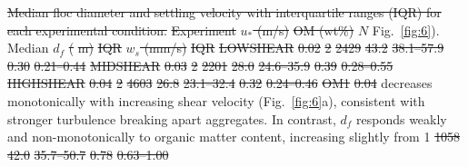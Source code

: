 \documentclass{agujournal2019}
\providecommand{\DIFadd}[1]{{\protect\color{blue} #1}} %
\providecommand{\DIFdel}[1]{{\protect\color{red}\sout{#1}}} %
\providecommand{\DIFaddFL}[1]{\DIFadd{#1}} %
\providecommand{\DIFdelFL}[1]{\DIFdel{#1}} %
\providecommand{\DIFaddbeginFL}{} %
\providecommand{\DIFaddendFL}{} %
\providecommand{\DIFdelbeginFL}{} %
\providecommand{\DIFdelendFL}{} %
\newcommand{\DIFscaledelfig}{0.5}
\newlength{\DIFdelgraphicswidth} %
\newlength{\DIFdelgraphicsheight} %
\newcommand{\DIFaddincludegraphics}[2][]{{\color{blue}\fbox{\DIFOincludegraphics[#1]{#2}}}} %
\newcommand{\DIFdelincludegraphics}[2][]{%
\sbox{\DIFdelgraphicsbox}{\DIFOincludegraphics[#1]{#2}}%
\settoboxwidth{\DIFdelgraphicswidth}{\DIFdelgraphicsbox} %
\settoboxtotalheight{\DIFdelgraphicsheight}{\DIFdelgraphicsbox} %
\scalebox{\DIFscaledelfig}{%
\parbox[b]{\DIFdelgraphicswidth}{\usebox{\DIFdelgraphicsbox}\\[-\baselineskip] \rule{\DIFdelgraphicswidth}{0em}}\llap{\resizebox{\DIFdelgraphicswidth}{\DIFdelgraphicsheight}{%
\setlength{\unitlength}{\DIFdelgraphicswidth}%
\begin{picture}(1,1)%
\thicklines\linethickness{2pt} %
{\color[rgb]{1,0,0}\put(0,0){\framebox(1,1){}}}%
{\color[rgb]{1,0,0}\put(0,0){\line( 1,1){1}}}%
{\color[rgb]{1,0,0}\put(0,1){\line(1,-1){1}}}%
\end{picture}%
}\hspace*{3pt}}} %
} %
\DeclareRobustCommand{\DIFaddbeginFL}{\DIFOaddbeginFL \let\includegraphics\DIFaddincludegraphics} %
\DeclareRobustCommand{\DIFaddendFL}{\DIFOaddendFL \let\includegraphics\DIFOincludegraphics} %
\DeclareRobustCommand{\DIFdelbeginFL}{\DIFOdelbeginFL \let\includegraphics\DIFdelincludegraphics} %
\DeclareRobustCommand{\DIFdelendFL}{\DIFOaddendFL \let\includegraphics\DIFOincludegraphics} %
\begin{document}
{%
\DIFdelFL{Median floc diameter and settling velocity with interquartile ranges (IQR) for each experimental condition.}%
}
\DIFdelFL{Experiment }%
\DIFdelFL{$u_*$ (m/s) }%
\DIFdelFL{OM (wt\%)}%
\DIFdelFL{$N$ }%
\DIFdelendFL \DIFaddbeginFL \DIFaddFL{Fig.~\ref{fig:6}). Median }\DIFaddendFL $d_f$ \DIFdelbeginFL \DIFdelFL{(}%
\DIFdelFL{m) }%
\DIFdelFL{IQR}%
\DIFdelFL{$w_s$ (mm/s)}%
\DIFdelFL{IQR}%
\DIFdelFL{LOWSHEAR  }%
\DIFdelFL{0.02 }%
\DIFdelFL{2 }%
\DIFdelFL{2429 }%
\DIFdelFL{43.2 }%
\DIFdelFL{38.1--57.9}%
\DIFdelFL{0.30 }%
\DIFdelFL{0.21--0.44}%
\DIFdelFL{MIDSHEAR  }%
\DIFdelFL{0.03 }%
\DIFdelFL{2 }%
\DIFdelFL{2201 }%
\DIFdelFL{28.0 }%
\DIFdelFL{24.6--35.9}%
\DIFdelFL{0.39 }%
\DIFdelFL{0.28--0.55}%
\DIFdelFL{HIGHSHEAR }%
\DIFdelFL{0.04 }%
\DIFdelFL{2 }%
\DIFdelFL{4603 }%
\DIFdelFL{26.8 }%
\DIFdelFL{23.1--32.4}%
\DIFdelFL{0.32 }%
\DIFdelFL{0.24--0.46}%
\DIFdelFL{OM1       }%
\DIFdelFL{0.04 }%
\DIFdelendFL \DIFaddbeginFL \DIFaddFL{decreases monotonically with increasing shear velocity (Fig.~\ref{fig:6}a), consistent with stronger turbulence breaking apart aggregates. In contrast, $d_f$ responds weakly and non-monotonically to organic matter content, increasing slightly from }\DIFaddendFL 1\DIFdelbeginFL %
\DIFdelFL{1058 }%
\DIFdelFL{42.0 }%
\DIFdelFL{35.7--50.7}%
\DIFdelFL{0.78 }%
\DIFdelFL{0.63--1.00}%
\end{document}
